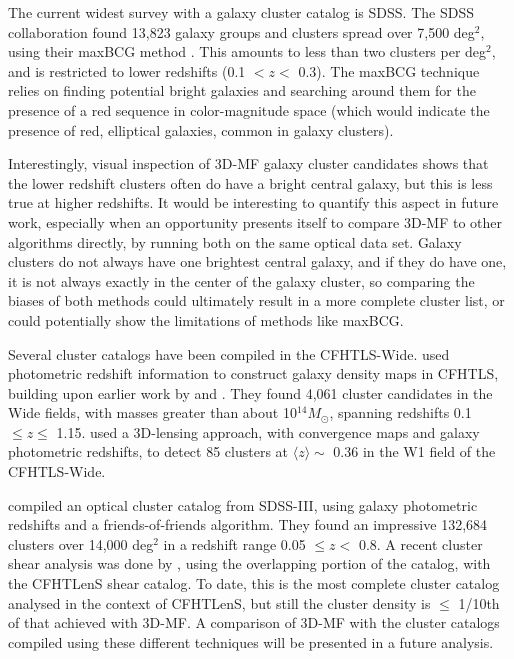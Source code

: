 The current widest survey with a galaxy cluster catalog is SDSS. The SDSS collaboration found 13,823 galaxy groups and clusters spread over 7,500 deg$^2$, using their maxBCG method \citep{Koester07}. This amounts to less than two clusters per deg$^2$, and is restricted to lower redshifts (0.1 $< z <$ 0.3). The maxBCG technique relies on finding potential bright galaxies and searching around them for the presence of a red sequence in color-magnitude space (which would indicate the presence of red, elliptical galaxies, common in galaxy clusters). 

Interestingly, visual inspection of \ac{3D-MF} galaxy cluster candidates shows that the lower redshift clusters often do have a bright central galaxy, but this is less true at higher redshifts. It would be interesting to quantify this aspect in future work, especially when an opportunity presents itself to compare \ac{3D-MF} to other algorithms directly, by running both on the same optical data set. Galaxy clusters do not always have one brightest central galaxy, and if they do have one, it is not always exactly in the center of the galaxy cluster, so comparing the biases of both methods could ultimately result in a more complete cluster list, or could potentially show the limitations of methods like maxBCG. 

Several cluster catalogs have been compiled in the \ac{CFHTLS}-Wide. \citet{Durret11} used photometric redshift information to construct galaxy density maps in \ac{CFHTLS}, building upon earlier work by \citet{Adami10} and \citet{Mazure07}. They found 4,061 cluster candidates in the Wide fields, with masses greater than about 10$^{14} M_{\odot}$, spanning redshifts 0.1 $\le z \le$ 1.15. \citet{Shan12} used a 3D-lensing approach, with convergence maps and galaxy photometric redshifts, to detect 85 clusters at $\langle z \rangle \sim$ 0.36 in the W1 field of the \ac{CFHTLS}-Wide.

\citet{Wen12} compiled an optical cluster catalog from SDSS-III, using galaxy photometric redshifts and a friends-of-friends algorithm. They found an impressive 132,684 clusters over 14,000 deg$^2$ in a redshift range 0.05 $\leq z <$ 0.8. A recent cluster shear analysis was done by \citet{Covone14}, using the overlapping portion of the \citet{Wen12} catalog, with the \ac{CFHTLenS} shear catalog. To date, this is the most complete cluster catalog analysed in the context of \ac{CFHTLenS}, but still the cluster density is $\leq$ 1/10th of that achieved with \ac{3D-MF}. A comparison of \ac{3D-MF} with the cluster catalogs compiled using these different techniques will be presented in a future analysis.

